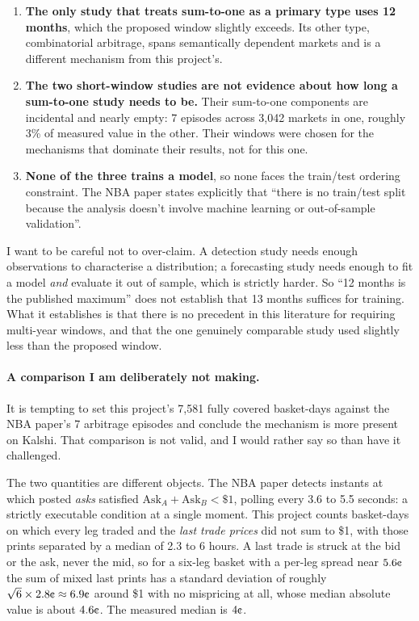 \documentclass[11pt,a4paper]{article}
\newcommand{\cent}{\text{\textcent}}
\begin{document}
\begin{enumerate}
  \item \textbf{The only study that treats sum-to-one as a primary type uses
        12 months}, which the proposed window slightly exceeds. Its other
        type, combinatorial arbitrage, spans semantically dependent markets
        and is a different mechanism from this project's.
  \item \textbf{The two short-window studies are not evidence about how long
        a sum-to-one study needs to be.} Their sum-to-one components are
        incidental and nearly empty: 7 episodes across 3,042 markets in one,
        roughly 3\% of measured value in the other. Their windows were chosen
        for the mechanisms that dominate their results, not for this one.
  \item \textbf{None of the three trains a model}, so none faces the
        train/test ordering constraint. The NBA paper states explicitly that
        ``there is no train/test split because the analysis doesn't involve
        machine learning or out-of-sample validation''.
\end{enumerate}

I want to be careful not to over-claim. A detection study needs enough
observations to characterise a distribution; a forecasting study needs enough
to fit a model \emph{and} evaluate it out of sample, which is strictly
harder. So ``12 months is the published maximum'' does not establish that 13
months suffices for training. What it establishes is that there is no
precedent in this literature for requiring multi-year windows, and that the
one genuinely comparable study used slightly less than the proposed window.

\paragraph{A comparison I am deliberately not making.} It is tempting to set
this project's 7,581 fully covered basket-days against the NBA paper's 7
arbitrage episodes and conclude the mechanism is more present on Kalshi.
That comparison is not valid, and I would rather say so than have it
challenged.

The two quantities are different objects. The NBA paper detects instants at
which posted \emph{asks} satisfied $\mathrm{Ask}_A + \mathrm{Ask}_B < \$1$,
polling every 3.6 to 5.5 seconds: a strictly executable condition at a single
moment. This project counts basket-days on which every leg traded and the
\emph{last trade prices} did not sum to \$1, with those prints separated by a
median of 2.3 to 6 hours. A last trade is struck at the bid or the ask, never
the mid, so for a six-leg basket with a per-leg spread near $5.6\cent$ the sum
of mixed last prints has a standard deviation of roughly
$\sqrt{6}\times2.8\cent \approx 6.9\cent$ around \$1 with no mispricing at all,
whose median absolute value is about $4.6\cent$. The measured median is
$4\cent$.
\end{document}
